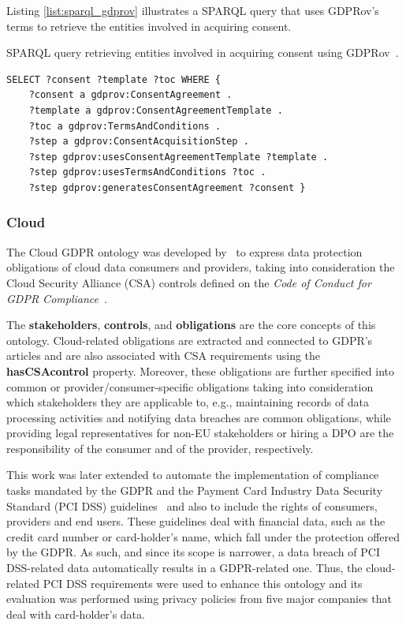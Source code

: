 Listing \ref{list:sparql_gdprov} illustrates a SPARQL query that uses GDPRov's terms to retrieve the entities involved in acquiring consent.

\begin{listing}
\caption[SPARQL query with GDPRov.]{SPARQL query retrieving entities involved in acquiring consent using GDPRov~\citep{pandit_modelling_2017}.}
\label{list:sparql_gdprov}
\begin{verbatim}
SELECT ?consent ?template ?toc WHERE {
    ?consent a gdprov:ConsentAgreement .
    ?template a gdprov:ConsentAgreementTemplate .
    ?toc a gdprov:TermsAndConditions .
    ?step a gdprov:ConsentAcquisitionStep .
    ?step gdprov:usesConsentAgreementTemplate ?template .
    ?step gdprov:usesTermsAndConditions ?toc .
    ?step gdprov:generatesConsentAgreement ?consent }
\end{verbatim}
\end{listing}

\subsubsection{Cloud}
\label{sec:cloud}

The Cloud GDPR ontology was developed by~\cite{elluri_knowledge_2018} to express data protection obligations of cloud data consumers and providers, taking into consideration the Cloud Security Alliance (CSA) controls defined on the \textit{Code of Conduct for GDPR Compliance}~\citep{cloud_security_alliance_-_privacy_level_agreement_working_group_code_2017}.

The \textbf{stakeholders}, \textbf{controls}, and \textbf{obligations} are the core concepts of this ontology.
Cloud-related obligations are extracted and connected to GDPR's articles and are also associated with CSA requirements using the \textbf{hasCSAcontrol} property.
Moreover, these obligations are further specified into common or provider/consumer-specific obligations taking into consideration which stakeholders they are applicable to, e.g., maintaining records of data processing activities and notifying data breaches are common obligations, while providing legal representatives for non-EU stakeholders or hiring a DPO are the responsibility of the consumer and of the provider, respectively.

This work was later extended \citep{elluri_integrated_2018} to automate the implementation of compliance tasks mandated by the GDPR and the Payment Card Industry Data Security Standard (PCI DSS) guidelines~\citep{pci_security_standards_council_payment_2018} and also to include the rights of consumers, providers and end users.
These guidelines deal with financial data, such as the credit card number or card-holder's name, which fall under the protection offered by the GDPR.
As such, and since its scope is narrower, a data breach of PCI DSS-related data automatically results in a GDPR-related one.
Thus, the cloud-related PCI DSS requirements were used to enhance this ontology and its evaluation was performed using privacy policies from five major companies that deal with card-holder's data.

